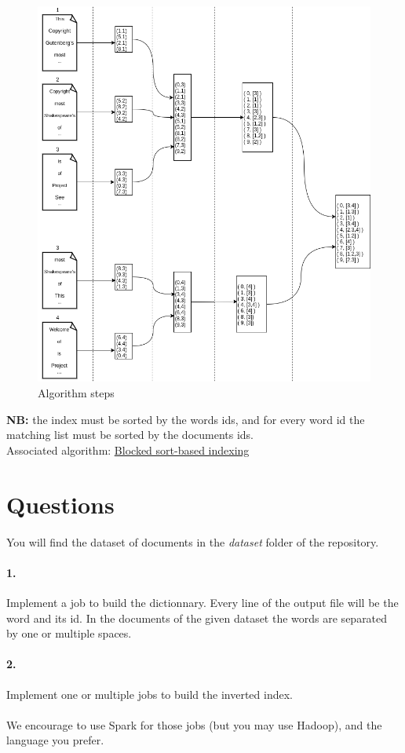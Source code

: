 \documentclass[12pt,french,titlepage]{article}
\begin{document}
\begin{figure}[H]
    \centering
    \includegraphics[scale=0.6]{images/algorithm}
    \caption{Algorithm steps}
    \label{fig:algorithm_steps}
\end{figure}
\textbf{NB:} the index must be sorted by the words ids, and for every word id the matching list must be sorted by the documents ids.
\\
Associated algorithm: \href{https://nlp.stanford.edu/IR-book/html/htmledition/blocked-sort-based-indexing-1.html}{\underline{Blocked sort-based indexing}}

\section{Questions}
You will find the dataset of documents in the \textit{dataset} folder of the repository.
\paragraph{1.} Implement a job to build the dictionnary. Every line of the output file will be the word and its id. In the documents of the given dataset the words are separated by one or multiple spaces.
\paragraph{2.} Implement one or multiple jobs to build the inverted index.
\\\\
We encourage to use Spark for those jobs (but you may use Hadoop), and the language you prefer.
\end{document}

